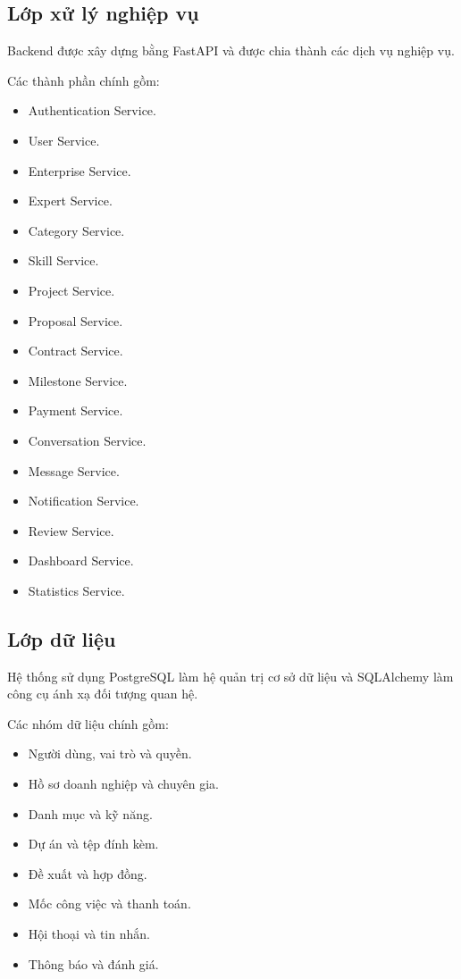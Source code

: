 
\subsection{Lớp xử lý nghiệp vụ}

Backend được xây dựng bằng FastAPI và được chia thành các dịch vụ nghiệp vụ.

Các thành phần chính gồm:

\begin{itemize}
    \item Authentication Service.
    \item User Service.
    \item Enterprise Service.
    \item Expert Service.
    \item Category Service.
    \item Skill Service.
    \item Project Service.
    \item Proposal Service.
    \item Contract Service.
    \item Milestone Service.
    \item Payment Service.
    \item Conversation Service.
    \item Message Service.
    \item Notification Service.
    \item Review Service.
    \item Dashboard Service.
    \item Statistics Service.
\end{itemize}


\subsection{Lớp dữ liệu}

Hệ thống sử dụng PostgreSQL làm hệ quản trị cơ sở dữ liệu và SQLAlchemy làm
công cụ ánh xạ đối tượng quan hệ.

Các nhóm dữ liệu chính gồm:

\begin{itemize}
    \item Người dùng, vai trò và quyền.
    \item Hồ sơ doanh nghiệp và chuyên gia.
    \item Danh mục và kỹ năng.
    \item Dự án và tệp đính kèm.
    \item Đề xuất và hợp đồng.
    \item Mốc công việc và thanh toán.
    \item Hội thoại và tin nhắn.
    \item Thông báo và đánh giá.
\end{itemize}

